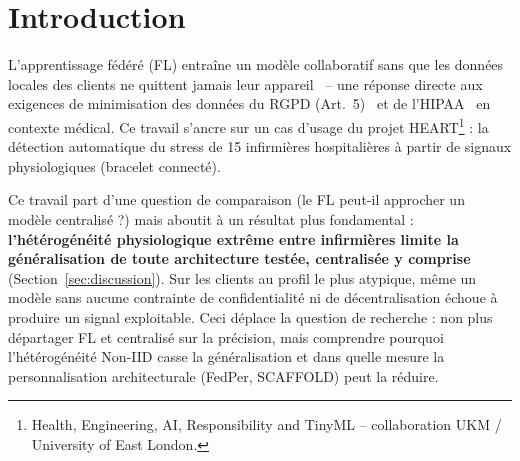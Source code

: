 \documentclass{acmart}
\begin{document}
\begin{abstract}
{\bf Conclusions:}
Le résultat central de ce travail n'est pas que le FL coûte cher face au centralisé --
c'est que \textbf{l'hétérogénéité extrême entre infirmières limite la généralisation de
toute architecture testée}, centralisée comprise : sur les clients au profil
physiologique le plus atypique, même un modèle entraîné sans aucune contrainte de
confidentialité ni de décentralisation échoue à produire un signal exploitable. Le FL
n'ajoute qu'un désavantage marginal, mais réel et mesurable, par-dessus ce problème de
fond. Ceci reformule la question de recherche : il ne s'agit pas de départager FL et
centralisé sur la précision (le centralisé restant de toute façon juridiquement
inadapté à ce type de données de santé au regard du RGPD, ce qui fait du FL la seule
approche viable en pratique), mais de comprendre pourquoi l'hétérogénéité Non-IID casse
la généralisation et comment la personnalisation architecturale (FedPer, SCAFFOLD) peut
la réduire. Nos résultats quantifient honnêtement ce coût résiduel, montrent qu'il reste
stable quel que soit le niveau de confidentialité visé, et qu'il peut être
significativement atténué par une architecture personnalisée -- tout en conservant un
modèle déployable sur microcontrôleur (5,32~Ko).
\end{abstract}


\maketitle

\section{Introduction}

L'apprentissage fédéré (FL) entraîne un modèle collaboratif sans que les données
locales des clients ne quittent jamais leur appareil~\cite{mcmahan2017communication} --
une réponse directe aux exigences de minimisation des données du RGPD
(Art.~5)~\cite{gdpr2016} et de l'HIPAA~\cite{hipaa1996} en contexte médical. Ce
travail s'ancre sur un cas d'usage du projet HEART\footnote{Health, Engineering, AI,
Responsibility and TinyML -- collaboration UKM / University of East London.} : la
détection automatique du stress de 15 infirmières hospitalières à partir de signaux
physiologiques (bracelet connecté).

Ce travail part d'une question de comparaison (le FL peut-il approcher un modèle
centralisé ?) mais aboutit à un résultat plus fondamental : \textbf{l'hétérogénéité
physiologique extrême entre infirmières limite la généralisation de toute
architecture testée, centralisée y comprise} (Section~\ref{sec:discussion}). Sur les
clients au profil le plus atypique, même un modèle sans aucune contrainte de
confidentialité ni de décentralisation échoue à produire un signal exploitable. Ceci
déplace la question de recherche : non plus départager FL et centralisé sur la
précision, mais comprendre pourquoi l'hétérogénéité Non-IID casse la généralisation et
dans quelle mesure la personnalisation architecturale (FedPer, SCAFFOLD) peut la
réduire.
\end{document}
